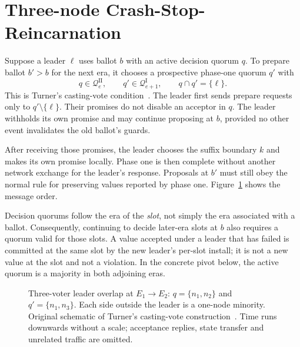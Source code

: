 \documentclass[10pt,journal,letterpaper]{IEEEtran}
\newcommand{\QI}{\mathcal{Q}^{\mathrm I}}
\newcommand{\QII}{\mathcal{Q}^{\mathrm {II}}}
\begin{document}
\section{Three-node Crash-Stop-Reincarnation}\label{sec:results}
Suppose a leader $\ell$ uses ballot $b$ with an active decision quorum $q$. To prepare ballot $b'>b$ for the next era, it chooses a prospective phase-one quorum $q'$ with
\begin{equation}
q\in\QII_e,\qquad q'\in\QI_{e+1},\qquad q\cap q'=\{\ell\}.
\label{eq:leader}
\end{equation}
This is Turner's casting-vote condition~\cite{turner}. The leader first sends prepare requests only to $q'\setminus\{\ell\}$. Their promises do not disable an acceptor in $q$. The leader withholds its own promise and may continue proposing at $b$, provided no other event invalidates the old ballot's guards.

After receiving those promises, the leader chooses the suffix boundary $k$ and makes its own promise locally. Phase one is then complete without another network exchange for the leader's response. Proposals at $b'$ must still obey the normal rule for preserving values reported by phase one. Figure~\ref{fig:overlap} shows the message order.

Decision quorums follow the era of the \emph{slot}, not simply the era associated with a ballot. Consequently, continuing to decide later-era slots at $b$ also requires a quorum valid for those slots. A value accepted under a leader that has failed is committed at the same slot by the new leader's per-slot install; it is not a new value at the slot and not a violation. In the concrete pivot below, the active quorum is a majority in both adjoining eras.

\begin{figure}[t]
\centering
{}
\caption{Three-voter leader overlap at $E_1\rightarrow E_2$: $q=\{n_1,n_2\}$ and $q'=\{n_1,n_3\}$. Each side outside the leader is a one-node minority. Original schematic of Turner's casting-vote construction~\cite{turner}. Time runs downwards without a scale; acceptance replies, state transfer and unrelated traffic are omitted.}
\label{fig:overlap}
\end{figure}
\end{document}
